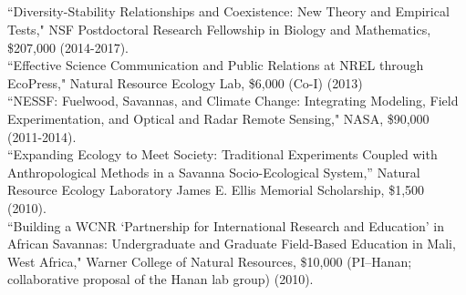 \documentclass[margin,line]{resume}
\begin{document}
\begin{resume}
	
    \section{\textmd{\textsf{}}}
    ``Diversity-Stability Relationships and Coexistence: New Theory and Empirical Tests," NSF Postdoctoral Research Fellowship in Biology and Mathematics, \$207,000 (2014-2017).\vspace{2mm}\\%
    ``Effective Science Communication and Public Relations at NREL through EcoPress," Natural Resource Ecology Lab, \$6,000 (Co-I) (2013) \vspace{2mm}\\%
    ``NESSF: Fuelwood, Savannas, and Climate Change: Integrating Modeling, Field Experimentation, and Optical and Radar Remote Sensing," NASA, \$90,000 (2011-2014). \vspace{2mm}\\%
    ``Expanding Ecology to Meet Society: Traditional Experiments Coupled with Anthropological Methods in a Savanna Socio-Ecological System,'' Natural Resource Ecology Laboratory James E. Ellis Memorial Scholarship, \$1,500 (2010).\vspace{2mm}\\%
    ``Building a WCNR `Partnership for International Research and Education' in African Savannas: Undergraduate and Graduate Field-Based Education in Mali, West Africa," Warner College of Natural Resources, \$10,000 (PI--Hanan; collaborative proposal of the Hanan lab group) (2010).%
    

\end{resume}
\end{document}
